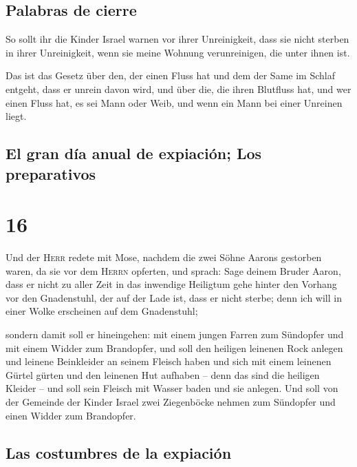 \hypertarget{palabras-de-cierre}{%
\subsection{Palabras de cierre}\label{palabras-de-cierre}}

 So sollt ihr die Kinder Israel warnen vor ihrer
Unreinigkeit, dass sie nicht sterben in ihrer Unreinigkeit, wenn sie
meine Wohnung verunreinigen, die unter ihnen ist.

 Das ist das Gesetz über den, der einen Fluss hat und dem
der Same im Schlaf entgeht, dass er unrein davon wird, 
und über die, die ihren Blutfluss hat, und wer einen Fluss hat, es sei
Mann oder Weib, und wenn ein Mann bei einer Unreinen liegt.

\hypertarget{el-gran-duxeda-anual-de-expiaciuxf3n-los-preparativos}{%
\subsection{El gran día anual de expiación; Los
preparativos}\label{el-gran-duxeda-anual-de-expiaciuxf3n-los-preparativos}}

\hypertarget{section-15}{%
\section{16}\label{section-15}}

 Und der \textsc{Herr} redete mit Mose, nachdem die zwei
Söhne Aarons gestorben waren, da sie vor dem \textsc{Herrn} opferten,
 und sprach: Sage deinem Bruder Aaron, dass er nicht zu
aller Zeit in das inwendige Heiligtum gehe hinter den Vorhang vor den
Gnadenstuhl, der auf der Lade ist, dass er nicht sterbe; denn ich will
in einer Wolke erscheinen auf dem Gnadenstuhl;

 sondern damit soll er hineingehen: mit einem jungen
Farren zum Sündopfer und mit einem Widder zum Brandopfer, 
und soll den heiligen leinenen Rock anlegen und leinene Beinkleider an
seinem Fleisch haben und sich mit einem leinenen Gürtel gürten und den
leinenen Hut aufhaben -- denn das sind die heiligen Kleider -- und soll
sein Fleisch mit Wasser baden und sie anlegen.  Und soll
von der Gemeinde der Kinder Israel zwei Ziegenböcke nehmen zum Sündopfer
und einen Widder zum Brandopfer.

\hypertarget{las-costumbres-de-la-expiaciuxf3n}{%
\subsection{Las costumbres de la
expiación}\label{las-costumbres-de-la-expiaciuxf3n}}

